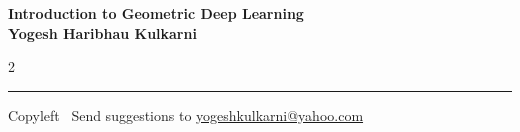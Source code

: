 \documentclass[8pt,landscape]{article}
\begin{document}
\footnotesize


\begin{center}
\Large{\textbf{Introduction to Geometric Deep Learning\\ Yogesh Haribhau Kulkarni}}  
\end{center}

\begin{multicols}{2}

\end{multicols}

\rule{\linewidth}{0.25pt}
\scriptsize
Copyleft \textcopyleft\  Send suggestions to 
\href{http://www.yogeshkulkarni.com}{yogeshkulkarni@yahoo.com}
\end{document}
